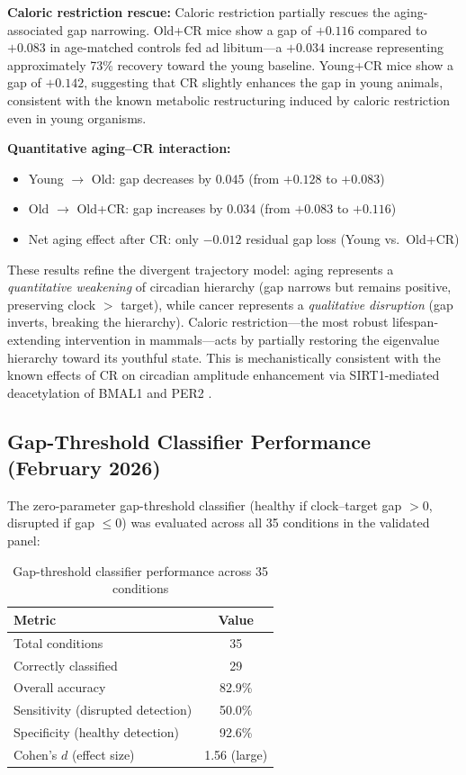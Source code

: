 \documentclass[11pt,a4paper]{article}
\begin{document}
\textbf{Caloric restriction rescue:} Caloric restriction partially rescues the aging-associated gap narrowing. Old+CR mice show a gap of $+0.116$ compared to $+0.083$ in age-matched controls fed ad libitum---a $+0.034$ increase representing approximately 73\% recovery toward the young baseline. Young+CR mice show a gap of $+0.142$, suggesting that CR slightly enhances the gap in young animals, consistent with the known metabolic restructuring induced by caloric restriction even in young organisms.

\textbf{Quantitative aging--CR interaction:}
\begin{itemize}
    \item Young $\rightarrow$ Old: gap decreases by $0.045$ (from $+0.128$ to $+0.083$)
    \item Old $\rightarrow$ Old+CR: gap increases by $0.034$ (from $+0.083$ to $+0.116$)
    \item Net aging effect after CR: only $-0.012$ residual gap loss (Young vs.\ Old+CR)
\end{itemize}

These results refine the divergent trajectory model: aging represents a \textit{quantitative weakening} of circadian hierarchy (gap narrows but remains positive, preserving clock $>$ target), while cancer represents a \textit{qualitative disruption} (gap inverts, breaking the hierarchy). Caloric restriction---the most robust lifespan-extending intervention in mammals---acts by partially restoring the eigenvalue hierarchy toward its youthful state. This is mechanistically consistent with the known effects of CR on circadian amplitude enhancement via SIRT1-mediated deacetylation of BMAL1 and PER2 \citep{sato2017circadian}.

\subsection{Gap-Threshold Classifier Performance (February 2026)}

The zero-parameter gap-threshold classifier (healthy if clock--target gap $> 0$, disrupted if gap $\leq 0$) was evaluated across all 35 conditions in the validated panel:

\begin{table}[H]
\centering
\caption{Gap-threshold classifier performance across 35 conditions}
\label{tab:gap_classifier}
\begin{tabular}{lc}
\toprule
Metric & Value \\
\midrule
Total conditions & 35 \\
Correctly classified & 29 \\
Overall accuracy & 82.9\% \\
Sensitivity (disrupted detection) & 50.0\% \\
Specificity (healthy detection) & 92.6\% \\
Cohen's $d$ (effect size) & 1.56 (large) \\
\bottomrule
\end{tabular}
\end{table}
\end{document}
